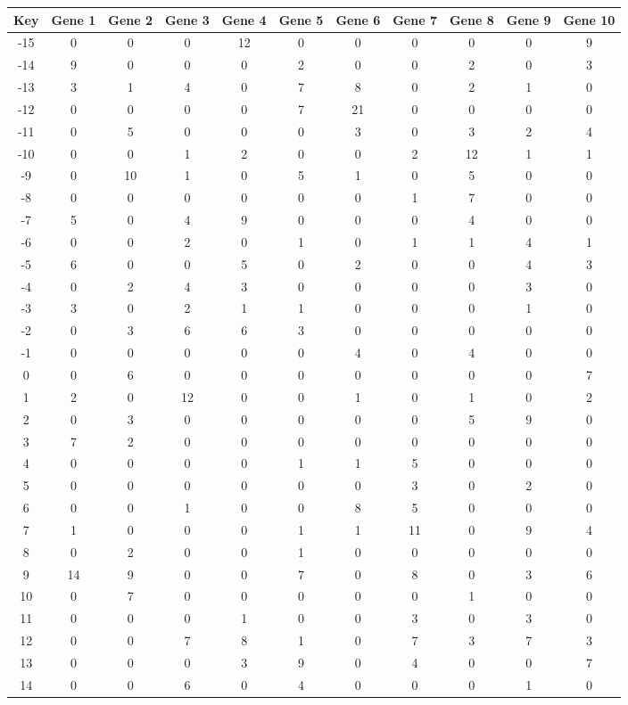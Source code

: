 \begin{tabular}{|c|c|c|c|c|c|c|c|c|c|c|}
\hline
Key & Gene 1 & Gene 2 & Gene 3 & Gene 4 & Gene 5 & Gene 6 & Gene 7 & Gene 8 & Gene 9 & Gene 10 \\
\hline
-15 & 0 & 0 & 0 & 12 & 0 & 0 & 0 & 0 & 0 & 9 \\
-14 & 9 & 0 & 0 & 0 & 2 & 0 & 0 & 2 & 0 & 3 \\
-13 & 3 & 1 & 4 & 0 & 7 & 8 & 0 & 2 & 1 & 0 \\
-12 & 0 & 0 & 0 & 0 & 7 & 21 & 0 & 0 & 0 & 0 \\
-11 & 0 & 5 & 0 & 0 & 0 & 3 & 0 & 3 & 2 & 4 \\
-10 & 0 & 0 & 1 & 2 & 0 & 0 & 2 & 12 & 1 & 1 \\
-9 & 0 & 10 & 1 & 0 & 5 & 1 & 0 & 5 & 0 & 0 \\
-8 & 0 & 0 & 0 & 0 & 0 & 0 & 1 & 7 & 0 & 0 \\
-7 & 5 & 0 & 4 & 9 & 0 & 0 & 0 & 4 & 0 & 0 \\
-6 & 0 & 0 & 2 & 0 & 1 & 0 & 1 & 1 & 4 & 1 \\
-5 & 6 & 0 & 0 & 5 & 0 & 2 & 0 & 0 & 4 & 3 \\
-4 & 0 & 2 & 4 & 3 & 0 & 0 & 0 & 0 & 3 & 0 \\
-3 & 3 & 0 & 2 & 1 & 1 & 0 & 0 & 0 & 1 & 0 \\
-2 & 0 & 3 & 6 & 6 & 3 & 0 & 0 & 0 & 0 & 0 \\
-1 & 0 & 0 & 0 & 0 & 0 & 4 & 0 & 4 & 0 & 0 \\
0 & 0 & 6 & 0 & 0 & 0 & 0 & 0 & 0 & 0 & 7 \\
1 & 2 & 0 & 12 & 0 & 0 & 1 & 0 & 1 & 0 & 2 \\
2 & 0 & 3 & 0 & 0 & 0 & 0 & 0 & 5 & 9 & 0 \\
3 & 7 & 2 & 0 & 0 & 0 & 0 & 0 & 0 & 0 & 0 \\
4 & 0 & 0 & 0 & 0 & 1 & 1 & 5 & 0 & 0 & 0 \\
5 & 0 & 0 & 0 & 0 & 0 & 0 & 3 & 0 & 2 & 0 \\
6 & 0 & 0 & 1 & 0 & 0 & 8 & 5 & 0 & 0 & 0 \\
7 & 1 & 0 & 0 & 0 & 1 & 1 & 11 & 0 & 9 & 4 \\
8 & 0 & 2 & 0 & 0 & 1 & 0 & 0 & 0 & 0 & 0 \\
9 & 14 & 9 & 0 & 0 & 7 & 0 & 8 & 0 & 3 & 6 \\
10 & 0 & 7 & 0 & 0 & 0 & 0 & 0 & 1 & 0 & 0 \\
11 & 0 & 0 & 0 & 1 & 0 & 0 & 3 & 0 & 3 & 0 \\
12 & 0 & 0 & 7 & 8 & 1 & 0 & 7 & 3 & 7 & 3 \\
13 & 0 & 0 & 0 & 3 & 9 & 0 & 4 & 0 & 0 & 7 \\
14 & 0 & 0 & 6 & 0 & 4 & 0 & 0 & 0 & 1 & 0 \\
\hline
\end{tabular}